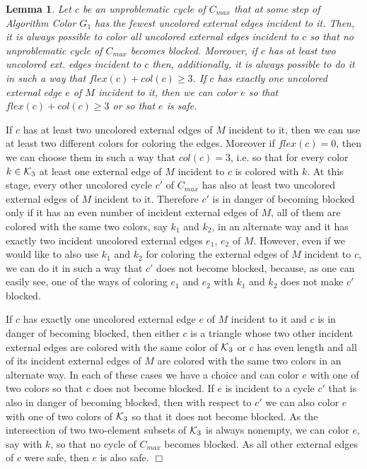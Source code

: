\documentclass[a4, 11pt]{article}
\newcommand{\dowod}{\noindent{\bf Proof.~}}
\newcommand{\koniec}{\hfill $\Box$\\[.1ex]}
\newcommand{\<}{\langle}
\renewcommand{\>}{\rangle}
\newcommand{\Kt}{{\cal K}_3}
\newtheorem{lemma}{Lemma}
\begin{document}
\begin{lemma} 
Let $c$ be an unproblematic  cycle of $C_{max}$ that at some step of Algorithm Color $G_1$ has  the fewest uncolored external edges  incident to it. Then, it is always possible to color all uncolored external edges incident to $c$ so that
no unproblematic cycle of $C_{max}$ becomes blocked. Moreover, if   $c$ has at least two uncolored ext. edges incident to $c$  then, additionally, it is always possible to do it in such a way that  $flex(c)+col(c) \geq 3$.
If $c$ has exactly one  uncolored external edge $e$  of $M$ incident to it, then we can color $e$ so that  $flex(c)+col(c) \geq 3$ or so that $e$ is safe.
\end{lemma}
\dowod If $c$ has at least two uncolored external edges of $M$ incident to it, then we can use at least two different colors for coloring the edges. Moreover if $flex(c)=0$, then we can choose them in such a way that $col(c)=3$, i.e. so that for every color $k \in\Kt$ at least one external edge of $M$ incident to $c$ is colored with $k$. At this stage, every other uncolored cycle $c'$ of $C_{max}$ has also at least two uncolored external edges of $M$ incident to it. Therefore $c'$ is in danger of becoming blocked only if it has an even number of incident external edges of $M$,
 all of them are colored with the same two colors, say $k_1$ and $k_2$,  in an alternate way and it has exactly two incident uncolored external edges $e_1$, $e_2$  of $M$.  However,  even if we would like to also use $k_1$ and $k_2$ for coloring the external edges of $M$ incident to $c$, we can do it in such a way that $c'$ does not become blocked, because, as one can easily see, one of the ways of coloring $e_1$ and $e_2$ with $k_1$ and $k_2$
does not make $c'$ blocked.

If $c$ has exactly one uncolored external edge $e$ of $M$ incident to it and $c$ is in  danger of becoming blocked, then either $c$ is a triangle whose two other incident external edges are colored with the same color of $\Kt$  or  $c$ has even length and all of its  incident external edges of $M$  are colored with the same two colors in an alternate way. In each of these cases we have a choice  and  can color $e$ with one of two colors so that $c$ does not become blocked. If $e$ is  incident to a cycle $c'$ that is also in danger of becoming blocked,
then with respect to $c'$ we can also color $e$ with one of two colors of $\Kt$  so that it does not become blocked.  As the intersection of two two-element subsets of $\Kt$ is always nonempty, we can color $e$, say with $k$,  so that no cycle of $C_{max}$ becomes blocked. As all other external edges of $c$ were safe, then $e$ is also safe. \koniec
\end{document}
